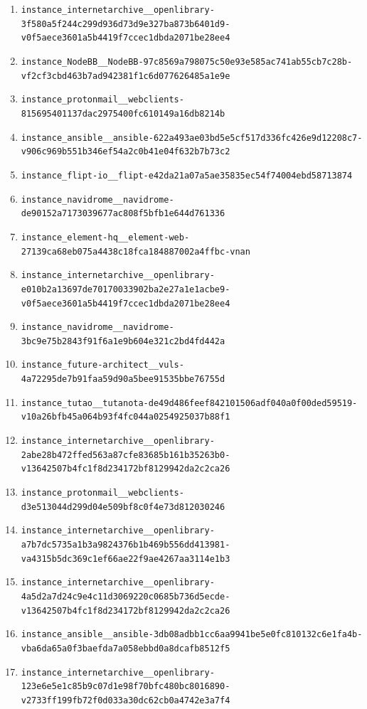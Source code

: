 \documentclass{llmxive}
\begin{document}
\begin{enumerate}
\item \texttt{instance\_internetarchive\_\_openlibrary-3f580a5f244c299d936d73d9e327ba873b6401d9-v0f5aece3601a5b4419f7ccec1dbda2071be28ee4}
\item \texttt{instance\_NodeBB\_\_NodeBB-97c8569a798075c50e93e585ac741ab55cb7c28b-vf2cf3cbd463b7ad942381f1c6d077626485a1e9e}
\item \texttt{instance\_protonmail\_\_webclients-815695401137dac2975400fc610149a16db8214b}
\item \texttt{instance\_ansible\_\_ansible-622a493ae03bd5e5cf517d336fc426e9d12208c7-v906c969b551b346ef54a2c0b41e04f632b7b73c2}
\item \texttt{instance\_flipt-io\_\_flipt-e42da21a07a5ae35835ec54f74004ebd58713874}
\item \texttt{instance\_navidrome\_\_navidrome-de90152a7173039677ac808f5bfb1e644d761336}
\item \texttt{instance\_element-hq\_\_element-web-27139ca68eb075a4438c18fca184887002a4ffbc-vnan}
\item \texttt{instance\_internetarchive\_\_openlibrary-e010b2a13697de70170033902ba2e27a1e1acbe9-v0f5aece3601a5b4419f7ccec1dbda2071be28ee4}
\item \texttt{instance\_navidrome\_\_navidrome-3bc9e75b2843f91f6a1e9b604e321c2bd4fd442a}
\item \texttt{instance\_future-architect\_\_vuls-4a72295de7b91faa59d90a5bee91535bbe76755d}
\item \texttt{instance\_tutao\_\_tutanota-de49d486feef842101506adf040a0f00ded59519-v10a26bfb45a064b93f4fc044a0254925037b88f1}
\item \texttt{instance\_internetarchive\_\_openlibrary-2abe28b472ffed563a87cfe83685b161b35263b0-v13642507b4fc1f8d234172bf8129942da2c2ca26}
\item \texttt{instance\_protonmail\_\_webclients-d3e513044d299d04e509bf8c0f4e73d812030246}
\item \texttt{instance\_internetarchive\_\_openlibrary-a7b7dc5735a1b3a9824376b1b469b556dd413981-va4315b5dc369c1ef66ae22f9ae4267aa3114e1b3}
\item \texttt{instance\_internetarchive\_\_openlibrary-4a5d2a7d24c9e4c11d3069220c0685b736d5ecde-v13642507b4fc1f8d234172bf8129942da2c2ca26}
\item \texttt{instance\_ansible\_\_ansible-3db08adbb1cc6aa9941be5e0fc810132c6e1fa4b-vba6da65a0f3baefda7a058ebbd0a8dcafb8512f5}
\item \texttt{instance\_internetarchive\_\_openlibrary-123e6e5e1c85b9c07d1e98f70bfc480bc8016890-v2733ff199fb72f0d033a30dc62cb0a4742e3a7f4}

\end{enumerate}
\end{document}
